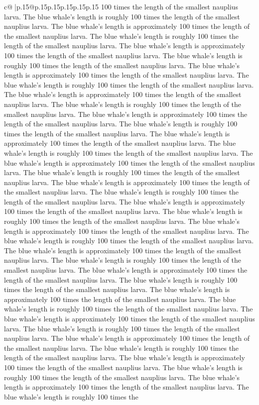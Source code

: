 \documentclass{article}
\begin{document}
{\begin{supertabular}{c@{$\;$}|p{.15\linewidth}@{}p{.15\linewidth}p{.15\linewidth}p{.15\linewidth}p{.15\linewidth}p{.15\linewidth}}
{{{100 times the length of the smallest nauplius larva. The blue whale's length is roughly 100 times the length of the smallest nauplius larva. The blue whale's length is approximately 100 times the length of the smallest nauplius larva. The blue whale's length is roughly 100 times the length of the smallest nauplius larva. The blue whale's length is approximately 100 times the length of the smallest nauplius larva. The blue whale's length is roughly 100 times the length of the smallest nauplius larva. The blue whale's length is approximately 100 times the length of the smallest nauplius larva. The blue whale's length is roughly 100 times the length of the smallest nauplius larva. The blue whale's length is approximately 100 times the length of the smallest nauplius larva. The blue whale's length is roughly 100 times the length of the smallest nauplius larva. The blue whale's length is approximately 100 times the length of the smallest nauplius larva. The blue whale's length is roughly 100 times the length of the smallest nauplius larva. The blue whale's length is approximately 100 times the length of the smallest nauplius larva. The blue whale's length is roughly 100 times the length of the smallest nauplius larva. The blue whale's length is approximately 100 times the length of the smallest nauplius larva. The blue whale's length is roughly 100 times the length of the smallest nauplius larva. The blue whale's length is approximately 100 times the length of the smallest nauplius larva. The blue whale's length is roughly 100 times the length of the smallest nauplius larva. The blue whale's length is approximately 100 times the length of the smallest nauplius larva. The blue whale's length is roughly 100 times the length of the smallest nauplius larva. The blue whale's length is approximately 100 times the length of the smallest nauplius larva. The blue whale's length is roughly 100 times the length of the smallest nauplius larva. The blue whale's length is approximately 100 times the length of the smallest nauplius larva. The blue whale's length is roughly 100 times the length of the smallest nauplius larva. The blue whale's length is approximately 100 times the length of the smallest nauplius larva. The blue whale's length is roughly 100 times the length of the smallest nauplius larva. The blue whale's length is approximately 100 times the length of the smallest nauplius larva. The blue whale's length is roughly 100 times the length of the smallest nauplius larva. The blue whale's length is approximately 100 times the length of the smallest nauplius larva. The blue whale's length is roughly 100 times the length of the smallest nauplius larva. The blue whale's length is approximately 100 times the length of the smallest nauplius larva. The blue whale's length is roughly 100 times the length of the smallest nauplius larva. The blue whale's length is approximately 100 times the length of the smallest nauplius larva. The blue whale's length is roughly 100 times the length of the smallest nauplius larva. The blue whale's length is approximately 100 times the length of the smallest nauplius larva. The blue whale's length is roughly 100 times the }}}
\end{supertabular}}
\end{document}
